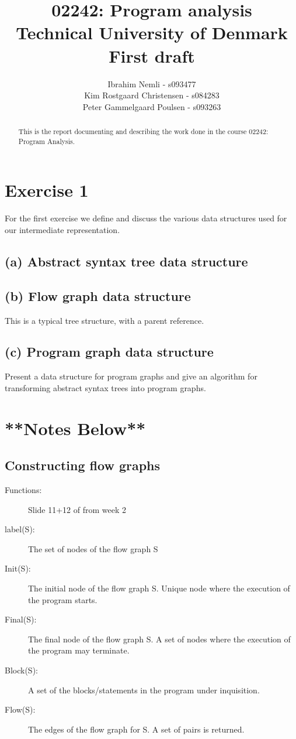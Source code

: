 \documentclass[12pt]{article}
\title{02242: Program analysis \\ 
		\medskip \large{Technical University of Denmark} \\ \medskip  \large{First draft}}
\author{Ibrahim Nemli - s093477 \\
        Kim Rostgaard Christensen - s084283\\
        Peter Gammelgaard Poulsen - s093263}
\begin{document}
\maketitle
 
\begin{abstract}
This is the report documenting and describing the work done in the course 02242: Program Analysis.
\end{abstract}
\section*{Exercise 1}
For the first exercise we define and discuss the various data structures used for our intermediate representation.
\subsection*{(a) Abstract syntax tree data structure}
\subsection*{(b) Flow graph data structure}
This is a typical tree structure, with a parent reference.
\subsection*{(c) Program graph data structure}
Present a data structure for program graphs and give an algorithm for
transforming abstract syntax trees into program graphs.


\section*{**Notes Below**}

\subsection*{Constructing flow graphs}

\begin{description}
   \item[Functions:] Slide 11+12 of from week 2
   \item[label(S):] The set of nodes of the flow graph S
   \item[Init(S):] The initial node of the flow graph S. Unique node where the execution of the program starts.
   \item[Final(S):] The final node of the flow graph S. A set of nodes where the execution of the program may terminate.
   \item[Block(S):] A set of the blocks/statements in the program under inquisition.
   \item[Flow(S):] The edges of the flow graph for S. A set of pairs is returned.
\end{description}
\end{document}
